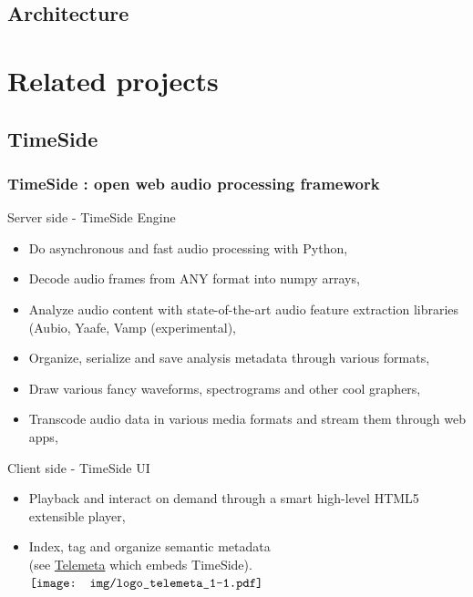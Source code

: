 \documentclass[10pt, final, hyperref, table]{beamer}
\begin{document}
\subsection*{Architecture}

\section{Related projects}
\frame{\tableofcontents[currentsection]}

\subsection{TimeSide}
\begin{frame}
 \frametitle{TimeSide : open web audio processing framework}%
\begin{block}{Server side - TimeSide Engine}
  \begin{itemize}
  \item \alert{Do} asynchronous and fast audio processing with Python,
  \item \alert{Decode} audio frames from ANY format into numpy arrays,
  \item \alert{Analyze} audio content with state-of-the-art audio feature extraction libraries (Aubio, Yaafe, Vamp (experimental),
  \item  \alert{Organize}, serialize and save analysis metadata through various formats,
  \item  \alert{Draw} various fancy waveforms, spectrograms and other cool graphers,
  \item  \alert{Transcode} audio data in various media formats and stream them through web apps,
  \end{itemize}
 
\end{block}
\begin{block}{Client side - TimeSide UI}
  \begin{itemize}
  \item   \alert{Playback} and  \alert{interact} on demand through a smart high-level HTML5 extensible player,
  \item   \alert{Index},  \alert{tag} and  \alert{organize semantic metadata} \\
(see \href{http://telemeta.org/}{Telemeta} which embeds TimeSide). 
\hfill $\vcenter{\hbox{\texttt{[image: img/logo\_telemeta\_1-1.pdf]}}}$
  \end{itemize}
\end{block}
\end{frame}
\end{document}
